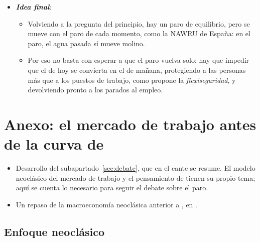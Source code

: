 \documentclass[11pt]{article}
\begin{document}
\begin{itemize}
  \begin{itemize}
  \item La tasa natural sigue siendo una referencia útil, pero no un destino.
  \item En España, con un paro de equilibrio alto y muy sensible al ciclo, conviene tratarla como algo que la política puede mover: para bien, con reformas, y para mal, con recesiones largas.
  \end{itemize}
\item \textbf{\emph{Idea final}}:
  \begin{itemize}
  \item Volviendo a la pregunta del principio, hay un paro de equilibrio, pero se mueve con el paro de cada momento, como la NAWRU de España: en el paro, el agua pasada sí mueve molino.
  \item Por eso no basta con esperar a que el paro vuelva solo; hay que impedir que el de hoy se convierta en el de mañana, protegiendo a las personas más que a los puestos de trabajo, como propone la \emph{flexiseguridad}, y devolviendo pronto a los parados al empleo.
  \end{itemize}
\end{itemize}

\clearpage
\appendix

\section{Anexo: el mercado de trabajo antes de la curva de }\label{anexo:debate}

\begin{itemize}
\item Desarrollo del subapartado~\ref{sec:debate}, que en el cante se resume. El modelo neoclásico del mercado de trabajo  y el pensamiento de   tienen su propio tema; aquí se cuenta lo necesario para seguir el debate sobre el paro.\nocite{Gali2013Keynes}
\item Un repaso de la macroeconomía neoclásica anterior a , en \textcite{HET2026Neoclassical}.
\end{itemize}

\subsection{Enfoque neoclásico}\label{anexo:debate-neoclasico}
\end{document}
